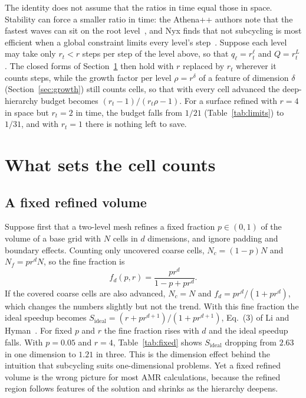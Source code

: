\documentclass[12pt]{article}
\theoremstyle{remark}
\newcommand{\Sid}{S_{\mathrm{ideal}}}
\begin{document}
The identity does not assume that the ratios in time equal those in space. Stability can force a smaller ratio in time: the Athena++ authors note that the fastest waves can sit on the root level~\cite{stone2020athena}, and Nyx finds that not subcycling is most efficient when a global constraint limits every level's step~\cite{almgren2013nyx}. Suppose each level may take only $r_t<r$ steps per step of the level above, so that $q_\ell=r_t^\ell$ and $Q=r_t^L$. The closed forms of Section~\ref{sec:dimension} then hold with $r$ replaced by $r_t$ wherever it counts steps, while the growth factor per level $\rho=r^\delta$ of a feature of dimension $\delta$ (Section~\ref{sec:growth}) still counts cells, so that with every cell advanced the deep-hierarchy budget becomes $(r_t-1)/(r_t\rho-1)$. For a surface refined with $r=4$ in space but $r_t=2$ in time, the budget falls from $1/21$ (Table~\ref{tab:limits}) to $1/31$, and with $r_t=1$ there is nothing left to save.

\section{What sets the cell counts}\label{sec:dimension}

\subsection{A fixed refined volume}\label{sec:fixed}

Suppose first that a two-level mesh refines a fixed fraction $p\in(0,1)$ of the volume of a base grid with $N$ cells in $d$ dimensions, and ignore padding and boundary effects. Counting only uncovered coarse cells, $N_c=(1-p)N$ and $N_f=pr^dN$, so the fine fraction is
\begin{equation}\label{eq:fixed}
f_d(p,r)=\frac{pr^d}{1-p+pr^d}.
\end{equation}
If the covered coarse cells are also advanced, $N_c=N$ and $f_d=pr^d/(1+pr^d)$, which changes the numbers slightly but not the trend. With this fine fraction the ideal speedup becomes $\Sid=(r+pr^{d+1})/(1+pr^{d+1})$, Eq.~(3) of Li and Hyman~\cite{li2006local}. For fixed $p$ and $r$ the fine fraction rises with $d$ and the ideal speedup falls. With $p=0.05$ and $r=4$, Table~\ref{tab:fixed} shows $\Sid$ dropping from $2.63$ in one dimension to $1.21$ in three. This is the dimension effect behind the intuition that subcycling suits one-dimensional problems. Yet a fixed refined volume is the wrong picture for most AMR calculations, because the refined region follows features of the solution and shrinks as the hierarchy deepens.
\end{document}
